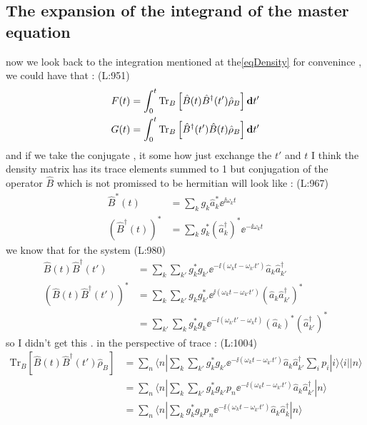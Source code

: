  \subsection{The expansion of the integrand of the master equation}
 now we look back to the integration mentioned at the\eqref{eqDensity}
 for convenince , we could have that :  
(L:951)
\begin{equation}
\begin{split}
F (t )=\int _{0}^{t }\text{Tr}_{B }\left[\hat{B }(t )\hat{B }^\dagger (t ')\hat{\rho }_{B }\right]\bold{d}t '\\
G (t )=\int _{0}^{t }\text{Tr}_{B }\left[\hat{B }^\dagger (t ')\hat{B }(t )\hat{\rho }_{B }\right]\bold{d}t '\\
\end{split}
\end{equation}
 and if we take the conjugate , it some how
 just exchange the 
 $ t ' $  and  
 $ t  $  I think the density matrix has its trace elements summed to 1
 but conjugation of the operator 
 $ \hat{B } $  which is not promissed to be hermitian will look like : 
(L:967)
\begin{equation}
\begin{split}
\hat{B }^*(t )&=\sum _{k }g _{k }\hat{a }_{k }^*\ee ^{\ii \omega _{k }t }\\
(\hat{B }^\dagger (t ))^*&=\sum _{k }g _{k }^*(\hat{a }^\dagger _{k })^*\ee ^{-\ii \omega _{k }t }\end{split}
\end{equation}
 we know that for the system
(L:980)
\begin{equation}
\begin{split}
\hat{B }(t )\hat{B }^\dagger (t ')&=\sum _{k }\sum _{k '}g _{k }^*g _{k '}\ee ^{-\ii (\omega _{k }t -\omega _{k '}t ')}\hat{a }_{k }\hat{a }^\dagger _{k '}\\
\left(\hat{B }(t )\hat{B }^\dagger (t ')\right)^*&=\sum _{k }\sum _{k '}g _{k }g _{k '}^*\ee ^{\ii (\omega _{k }t -\omega _{k '}t ')}(\hat{a }_{k }\hat{a }^\dagger _{k '})^*\\
&=\sum _{k '}\sum _{k }g _{k }^*g _{k }\ee ^{-\ii (\omega _{k '}t '-\omega _{k }t )}(\hat{a }_{k })^*(\hat{a }^\dagger _{k '})^*\end{split}
\end{equation}
 so I didn't get this . 
 in the perspective of trace : 
(L:1004)
\begin{equation}
\begin{split}
\text{Tr}_{B }\left[\hat{B }(t )\hat{B }^\dagger (t ')\hat{\rho }_{B }\right]&=\sum _{n }\langle n |\sum _{k }\sum _{k '}g _{k }^*g _{k '}\ee ^{-\ii (\omega _{k }t -\omega _{k '}t ')}\hat{a }_{k }\hat{a }^\dagger _{k '}\sum _{i }p _{i }|i \rangle \langle i ||n \rangle \\
&=\sum _{n }\langle n |\sum _{k }\sum _{k '}g _{k }^*g _{k '}p _{n }\ee ^{-\ii (\omega _{k }t -\omega _{k '}t ')}\hat{a }_{k }\hat{a }^\dagger _{k '}|n \rangle \\
&=\sum _{n }\langle n |\sum _{k }g _{k }^*g _{k }p _{n }\ee ^{-\ii (\omega _{k }t -\omega _{k '}t ')}\hat{a }_{k }\hat{a }^\dagger _{k }|n \rangle \end{split}
\end{equation}

